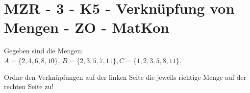 \section{MZR - 3 - K5 - Verknüpfung von Mengen - ZO - MatKon}

\begin{beispiel}[MZR]{1}
Gegeben sind die Mengen:\\ 
$A=\{2, 4, 6, 8, 10\}$, $B=\{2, 3, 5, 7, 11\}, C=\{1, 2, 3, 5, 8, 11\}$.

Ordne den Verknüpfungen auf der linken Seite die jeweils richtige Menge auf der rechten Seite zu!

\end{beispiel}